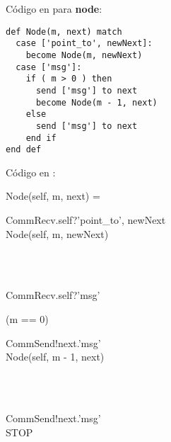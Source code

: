 Código en \SAL para \textbf{node}:

\begin{lstlisting}[language=sal, style=simple]
def Node(m, next) match
  case ['point_to', newNext]:
    become Node(m, newNext)
  case ['msg']:
    if ( m > 0 ) then
      send ['msg'] to next
      become Node(m - 1, next)
    else
      send ['msg'] to next
    end if
end def
\end{lstlisting}

Código en \CSP:

\begin{process}
Node(self, m, next) = \\ \quad
  \begin{block}
  CommRecv.self?\langle 'point_to', newNext \rangle \then \\
  Node(self, m, newNext)
  \end{block} \\

  \Extchoice \\ \quad
  
  \begin{block}
  CommRecv.self?\langle 'msg' \rangle \then {} \\ \quad
    \begin{block}
    \If (m == 0) \Then {} \\ \quad
      \begin{block} 
      CommSend!next.\langle 'msg' \rangle \then \\
      Node(self, m - 1, next) 
      \end{block} \\
    \Else {} \\ \quad
      \begin{block}
      CommSend!next.\langle 'msg' \rangle \then \\
      STOP
      \end{block}
    \end{block}
  \end{block} 
\end{process}

% 

